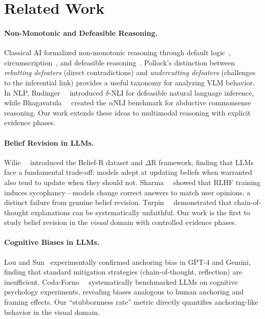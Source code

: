 \section{Related Work}
\label{sec:related}

\paragraph{Non-Monotonic and Defeasible Reasoning.}
Classical AI formalized non-monotonic reasoning through default logic~\cite{reiter1980logic}, circumscription~\cite{mccarthy1980circumscription}, and defeasible reasoning~\cite{pollock1987defeasible}.  Pollock's distinction between \emph{rebutting defeaters} (direct contradictions) and \emph{undercutting defeaters} (challenges to the inferential link) provides a useful taxonomy for analyzing VLM behavior.  In NLP, Rudinger~\etal~\cite{rudinger2020thinking} introduced $\delta$-NLI for defeasible natural language inference, while Bhagavatula~\etal~\cite{bhagavatula2020abductive} created the $\alpha$NLI benchmark for abductive commonsense reasoning.  Our work extends these ideas to multimodal reasoning with explicit evidence phases.

\paragraph{Belief Revision in LLMs.}
Wilie~\etal~\cite{wilie2024belief} introduced the Belief-R dataset and $\Delta$R framework, finding that LLMs face a fundamental trade-off: models adept at updating beliefs when warranted also tend to update when they should not.  Sharma~\etal~\cite{sharma2024sycophancy} showed that RLHF training induces sycophancy---models change correct answers to match user opinions, a distinct failure from genuine belief revision.  Turpin~\etal~\cite{turpin2024unfaithful} demonstrated that chain-of-thought explanations can be systematically unfaithful.  Our work is the first to study belief revision in the \emph{visual} domain with controlled evidence phases.

\paragraph{Cognitive Biases in LLMs.}
Lou and Sun~\cite{lou2024anchoring} experimentally confirmed anchoring bias in GPT-4 and Gemini, finding that standard mitigation strategies (chain-of-thought, reflection) are insufficient.  Coda-Forno~\etal~\cite{codaforno2024cogbench} systematically benchmarked LLMs on cognitive psychology experiments, revealing biases analogous to human anchoring and framing effects.  Our ``stubbornness rate'' metric directly quantifies anchoring-like behavior in the visual domain.

